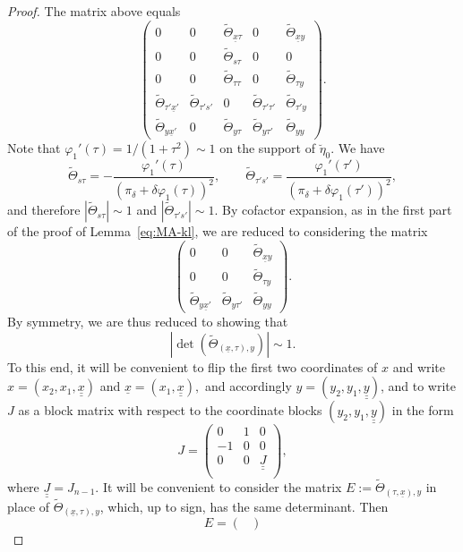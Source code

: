 \documentclass[leqno]{amsart}
\theoremstyle{definition}
\theoremstyle{remark}
\numberwithin{equation}{section}
\begin{document}
\begin{proof}
The matrix above equals
\[
\begin{pmatrix}
0 & 0 &\tilde\Theta_{\underline x\tau}&0&
   \tilde\Theta_{\underline x y}\\
0 &  0&\tilde\Theta_{s\tau}&0&0\\
0 & 0 & \tilde\Theta_{\tau\tau}&0&
   \tilde\Theta_{\tau y}\\
\tilde\Theta_{\tau'\underline x'}&
   \tilde\Theta_{\tau's'}& 0&
   \tilde\Theta_{\tau'\tau'}&
   \tilde\Theta_{\tau' y}\\
\tilde\Theta_{y\underline x'} & 0&
   \tilde\Theta_{y\tau}&
   \tilde\Theta_{y\tau'}&
   \tilde\Theta_{yy}
\end{pmatrix}.
\]
Note that $\varphi_1'(\tau)=1/(1+\tau^2)\sim1$ on the support of $\breve\eta_0$. We have
\[
\tilde\Theta_{s\tau}
=-\frac{\varphi_1'(\tau)}{(\pi_\delta+\delta\varphi_1(\tau))^2},
\qquad
\tilde\Theta_{\tau's'}
=\frac{\varphi_1'(\tau')}{(\pi_\delta+\delta\varphi_1(\tau'))^2},
\]
and therefore $|\tilde\Theta_{s\tau}|\sim1$ and
$|\tilde\Theta_{\tau's'}|\sim1$.
By cofactor expansion, as in the first part of the proof of
Lemma~\ref{eq:MA-kl}, we are reduced to considering the matrix 
\[
\begin{pmatrix} 0&0&\tilde\Theta_{\underline x y}\\
0&0&\tilde\Theta_{\tau y}\\
\tilde\Theta_{y\underline x'}& \tilde\Theta_{y\tau'}& \tilde\Theta_{yy}
\end{pmatrix}.
\]
By symmetry, we are thus reduced to showing that
\[
|\det(\tilde\Theta_{(\underline x,\tau),y})|\sim1.
\]
To this end, it will be convenient to flip  the first two coordinates of $x$ and write $x=(x_2,x_1,\underline{\underline x})$ and $\underline x = (x_1,\underline{\underline x}),$ and accordingly $y = (y_2,y_1,\underline{\underline y})$, and to write  $J$  as a block matrix with respect to the coordinate blocks $(y_2,y_1,\underline{\underline y})$ in the form 
\[
J=\begin{pmatrix}
0 &  1& 0 \\
-1 & 0 &0\\
0 & 0& \underline{\underline J} \\
\end{pmatrix},
\]
where $\underline{\underline J}=J_{n-1}$. It will be convenient to consider the matrix $E:=\tilde\Theta_{(\tau,\underline x),y}$ in place of $\tilde\Theta_{(\underline x,\tau),y}$, which, up to sign, has the same determinant. Then
\[
E = 
\begin{pmatrix}

\end{pmatrix}\]
\end{proof}
\end{document}
